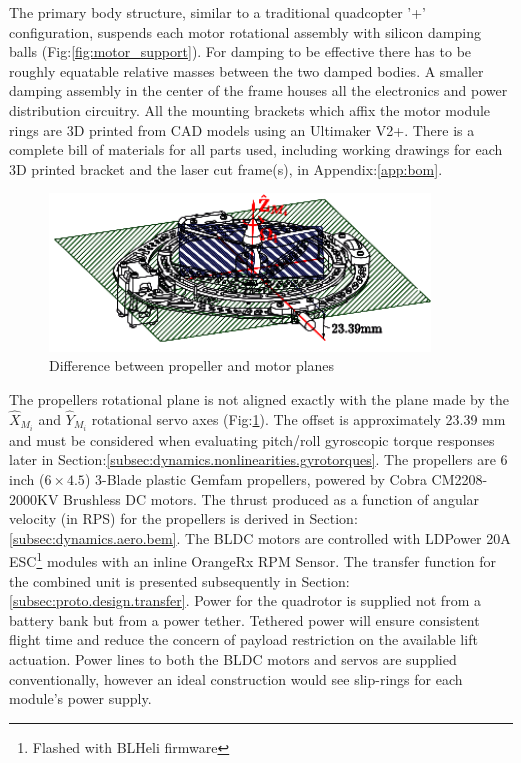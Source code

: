 \par
The primary body structure, similar to a traditional quadcopter '+' configuration, suspends each motor rotational assembly with silicon damping balls (Fig:\ref{fig:motor_support}). For damping to be effective there has to be roughly equatable relative masses between the two damped bodies. A smaller damping assembly in the center of the frame houses all the electronics and power distribution circuitry. All the mounting brackets which affix the motor module rings are 3D printed from CAD models using an Ultimaker V2+\cite{ultimaker}. There is a complete bill of materials for all parts used, including working drawings for each 3D printed bracket and the laser cut frame(s), in Appendix:\ref{app:bom}.
\par
\begin{figure}[hbtp]
\centering
\includegraphics[width=0.9\textwidth]{figs/motor-prop}
\caption{Difference between propeller and motor planes}
\label{fig:motor_prop}
\end{figure}
The propellers rotational plane is not aligned exactly with the plane made by the $\hat{X}_{M_i}$ and $\hat{Y}_{M_i}$ rotational servo axes (Fig:\ref{fig:motor_prop}). The offset is approximately 23.39 mm and must be considered when evaluating pitch/roll gyroscopic torque responses later in Section:\ref{subsec:dynamics.nonlinearities.gyrotorques}. The propellers are 6 inch ($6 \times 4.5$) 3-Blade plastic Gemfam propellers, powered by Cobra CM2208-2000KV Brushless DC motors. The thrust produced as a function of angular velocity (in RPS) for the propellers is derived in Section:\ref{subsec:dynamics.aero.bem}. 
\newpage
The BLDC motors are controlled with LDPower 20A ESC\footnote{Flashed with BLHeli\cite{BLHeli} firmware} modules with an inline OrangeRx RPM Sensor. The transfer function for the combined unit is presented subsequently in Section:\ref{subsec:proto.design.transfer}. Power for the quadrotor is supplied not from a battery bank but from a power tether. Tethered power will ensure consistent flight time and reduce the concern of payload restriction on the available lift actuation. Power lines to both the BLDC motors and servos are supplied conventionally, however an ideal construction would see slip-rings for each module's power supply. 
